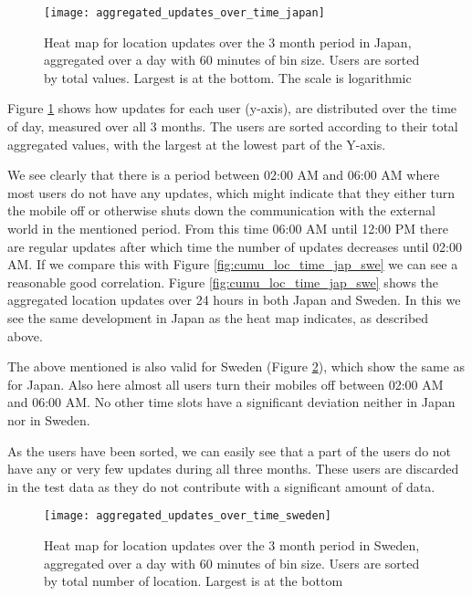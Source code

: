 \begin{figure}[H]
    \hspace*{-0.8cm}
    \centering
    \texttt{[image: aggregated\_updates\_over\_time\_japan]}
    \caption{Heat map for location updates over the 3 month period in Japan, aggregated over a day with 60 minutes of bin size. Users are sorted by total values. Largest is at the bottom. The scale is logarithmic}
    \label{fig:agg_heatmap_jap}
\end{figure}
Figure \ref{fig:agg_heatmap_jap} shows how updates for each user (y-axis), are distributed over the time of day, measured over all 3 months. The users are sorted according to their total aggregated values, with the largest at the lowest part of the Y-axis.  

We see clearly that there is a period between 02:00 AM and 06:00 AM where most users do not have any updates, which might indicate that they either turn the mobile off or otherwise shuts down the communication with the external world in the mentioned period. From this time 06:00 AM until 12:00 PM there are regular updates after which time the number of updates decreases until 02:00 AM. If we compare this with Figure \ref{fig:cumu_loc_time_jap_swe} we can see a reasonable good correlation. Figure \ref{fig:cumu_loc_time_jap_swe} shows the  aggregated location updates over 24 hours in both Japan and Sweden. In this we see the same development in Japan as the heat map indicates, as described above. 

The above mentioned is also valid for Sweden (Figure \ref{fig:agg_heatmap_swe}), which show the same as for Japan. Also here almost all users turn their mobiles off between 02:00 AM and 06:00 AM. 
No other time slots have a significant deviation neither in Japan nor in Sweden.  

As the users have been sorted, we can easily see that a part of the users do not have any or very few updates during all three months. These users are discarded in the test data as they do not contribute with a significant amount of data.  


\begin{figure}[H]
    \hspace*{-0.8cm}
    \centering
    \texttt{[image: aggregated\_updates\_over\_time\_sweden]}
    \caption{Heat map for location updates over the 3 month period in Sweden, aggregated over a day with 60 minutes of bin size. Users are sorted by total number of location. Largest is at the bottom}
    \label{fig:agg_heatmap_swe}
\end{figure}

